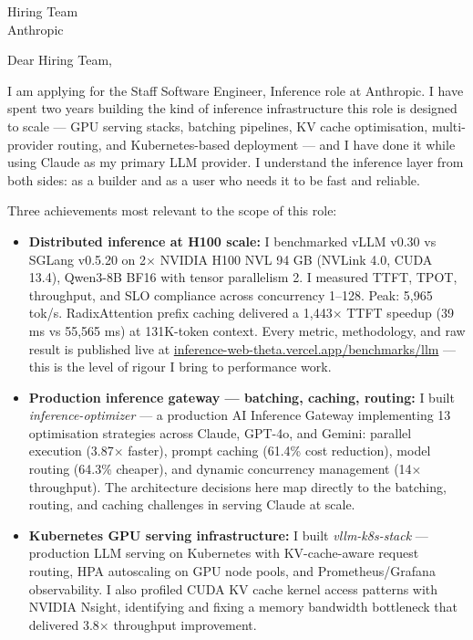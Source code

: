 \documentclass[12pt,a4paper]{letter}
\date{\today}
\begin{document}
\begin{letter}{Hiring Team \\ Anthropic}

\opening{Dear Hiring Team,}

I am applying for the Staff Software Engineer, Inference role at Anthropic. I have spent two years building the kind of inference infrastructure this role is designed to scale — GPU serving stacks, batching pipelines, KV cache optimisation, multi-provider routing, and Kubernetes-based deployment — and I have done it while using Claude as my primary LLM provider. I understand the inference layer from both sides: as a builder and as a user who needs it to be fast and reliable.

Three achievements most relevant to the scope of this role:

\begin{itemize}
  \item \textbf{Distributed inference at H100 scale:} I benchmarked vLLM v0.30 vs SGLang v0.5.20 on 2$\times$ NVIDIA H100 NVL 94 GB (NVLink 4.0, CUDA 13.4), Qwen3-8B BF16 with tensor parallelism 2. I measured TTFT, TPOT, throughput, and SLO compliance across concurrency 1--128. Peak: 5,965 tok/s. RadixAttention prefix caching delivered a 1,443$\times$ TTFT speedup (39 ms vs 55,565 ms) at 131K-token context. Every metric, methodology, and raw result is published live at \href{https://inference-web-theta.vercel.app/benchmarks/llm}{inference-web-theta.vercel.app/benchmarks/llm} — this is the level of rigour I bring to performance work.

  \item \textbf{Production inference gateway — batching, caching, routing:} I built \textit{inference-optimizer} — a production AI Inference Gateway implementing 13 optimisation strategies across Claude, GPT-4o, and Gemini: parallel execution (3.87$\times$ faster), prompt caching (61.4\% cost reduction), model routing (64.3\% cheaper), and dynamic concurrency management (14$\times$ throughput). The architecture decisions here map directly to the batching, routing, and caching challenges in serving Claude at scale.

  \item \textbf{Kubernetes GPU serving infrastructure:} I built \textit{vllm-k8s-stack} — production LLM serving on Kubernetes with KV-cache-aware request routing, HPA autoscaling on GPU node pools, and Prometheus/Grafana observability. I also profiled CUDA KV cache kernel access patterns with NVIDIA Nsight, identifying and fixing a memory bandwidth bottleneck that delivered 3.8$\times$ throughput improvement.
\end{itemize}


\end{letter}
\end{document}
